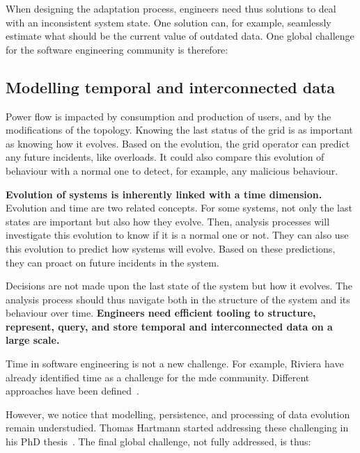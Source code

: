 When designing the adaptation process, engineers need thus solutions to deal with an inconsistent system state.
One solution can, for example, seamlessly estimate what should be the current value of outdated data.
One global challenge for the software engineering community is therefore:
\vspace{-2em}


\subsection{Modelling temporal and interconnected data}
Power flow is impacted by consumption and production of users, and by the modifications of the topology.
Knowing the last status of the grid is as important as knowing how it evolves.
Based on the evolution, the grid operator can predict any future incidents, like overloads.
It could also compare this evolution of behaviour with a normal one to detect, for example, any malicious behaviour.

\textbf{Evolution of systems is inherently linked with a time dimension.}
Evolution and time are two related concepts.
For some systems, not only the last states are important but also how they evolve.
Then, analysis processes will investigate this evolution to know if it is a normal one or not.
They can also use this evolution to predict how systems will evolve.
Based on these predictions, they can proact on future incidents in the system.

Decisions are not made upon the last state of the system but how it evolves.
The analysis process should thus navigate both in the structure of the system and its behaviour over time.
\textbf{Engineers need efficient tooling to structure, represent, query, and store temporal and interconnected data on a large scale.}

Time in software engineering is not a new challenge.
For example, Riviera \etal \cite{DBLP:conf/models/RiveraRV08} have already identified time as a challenge for the \gls{mde} community.
Different approaches have been defined~\cite{DBLP:conf/sle/BousseCCGB15, DBLP:conf/sle/KansoT12, DBLP:conf/icse/KoegelH10, DBLP:conf/seke/0001FNMKT14}.

However, we notice that modelling, persistence, and processing of data evolution remain understudied.
Thomas Hartmann started addressing these challenging in his PhD thesis~\cite{DBLP:phd/basesearch/Hartmann16}.
The final global challenge, not fully addressed, is thus:
\vspace{-2em}
